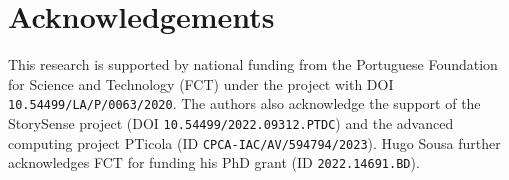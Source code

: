 \section*{Acknowledgements}

This research is supported by national funding from the Portuguese Foundation for Science and Technology (FCT) under the project with DOI \texttt{\small 10.54499/LA/P/0063/2020}. The authors also acknowledge the support of the StorySense project (DOI \texttt{\small 10.54499/2022.09312.PTDC}) and the advanced computing project PTicola (ID \texttt{\small CPCA-IAC/AV/594794/2023}). Hugo Sousa further acknowledges FCT for funding his PhD grant (ID \texttt{\small 2022.14691.BD}).
